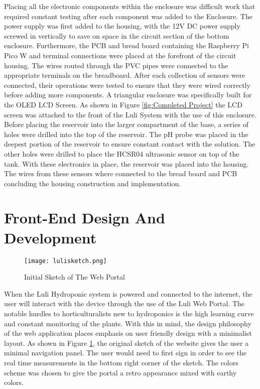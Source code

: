 \documentclass[12pt]{article} %
\begin{document}
\pagebreak

Placing all the electronic components within the enclosure was difficult work that required constant testing after each component was added to the Enclosure. The power supply was first added to the housing, with the 12V DC power supply screwed in vertically to save on space in the circuit section of the bottom enclosure. Furthermore, the PCB and bread board containing the Raspberry Pi Pico W and terminal connections were placed at the forefront of the circuit housing. The wires routed through the PVC pipes were connected to the appropriate terminals on the breadboard. After each collection of sensors were connected, their operations were tested to ensure that they were wired correctly before adding more components. A triangular enclosure was specifically built for the OLED LCD Screen. As shown in Figure \ref{fig:Completed Project} the LCD screen was attached to the front of the Luli System with the use of this enclosure. Before placing the reservoir into the larger compartment of the base, a series of holes were drilled into the top of the reservoir. The pH probe was placed in the deepest portion of the reservoir to ensure constant contact with the solution. The other holes were drilled to place the HCSR04 ultrasonic sensor on top of the tank. With these electronics in place, the reservoir was placed into the housing. The wires from these sensors where connected to the bread board and PCB concluding the housing construction and implementation. 


\section{Front-End Design And Development}

\begin{figure}[H]
  \centering
  \texttt{[image: lulisketch.png]}
  \caption{Initial Sketch of The Web Portal}
  \label{fig: Portal Sketch}
\end{figure}

\pagebreak

When the Luli Hydroponic system is powered and connected to the internet, the user will interact with the device through the use of the Luli Web Portal. The notable hurdles to horticulturalists new to hydroponics is the high learning curve and constant monitoring of the plants. With this in mind, the design philosophy of the web application places emphasis on user friendly design with a minimalist layout. As shown in Figure \ref{fig: Portal Sketch}, the original sketch of the website gives the user a minimal navigation panel. The user would need to first sign in order to see the real time measurements in the bottom right corner of the sketch. The colors scheme was chosen to give the portal a retro appearance mixed with earthy colors.
\end{document}
